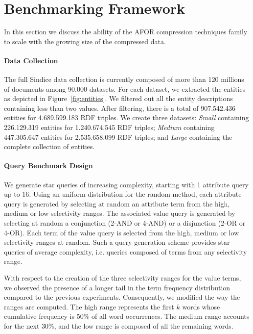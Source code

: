 \section{Benchmarking Framework}

In this section we discuss the ability of the AFOR compression techniques
family to scale with the growing size of the compressed data.

\paragraph{Data Collection}

The full Sindice data collection is currently composed of more
than 120 millions of documents among 90.000 datasets. For each dataset, we
extracted the entities as depicted in Figure~\ref{fig:entities}.
We filtered out all the entity descriptions containing less than two values.
After filtering, there is a total of 907.542.436 entities for 4.689.599.183
RDF triples. We create three datasets: \emph{Small} containing 226.129.319
entities for 1.240.674.545 RDF triples; \emph{Medium} containing
447.305.647 entities for 2.535.658.099 RDF triples; and \emph{Large}
containing the complete collection of entities.

\paragraph{Query Benchmark Design}

We generate star queries of increasing complexity, starting with 1 attribute
query up to 16. Using an uniform distribution for the random method, each
attribute query is generated by selecting at random an attribute term from the
high, medium or low selectivity ranges. The associated value query is generated
by selecting at random a conjunction (2-AND or 4-AND) or a disjunction (2-OR or
4-OR). Each term of the value query is selected from the high, medium or low
selectivity ranges at random. Such a query generation scheme provides star
queries of average complexity, i.e. queries composed of terms from any
selectivity range.

With respect to the creation of the three selectivity ranges for the value
terms, we observed the presence of a longer tail in the term frequency
distribution compared to the previous experiments. Consequently, we modified
the way the ranges are computed. The high range represents the first $k$ words
whose cumulative frequency is 50\% of all word occurrences. The medium range
accounts for the next 30\%, and the low range is composed of all the remaining
words.

